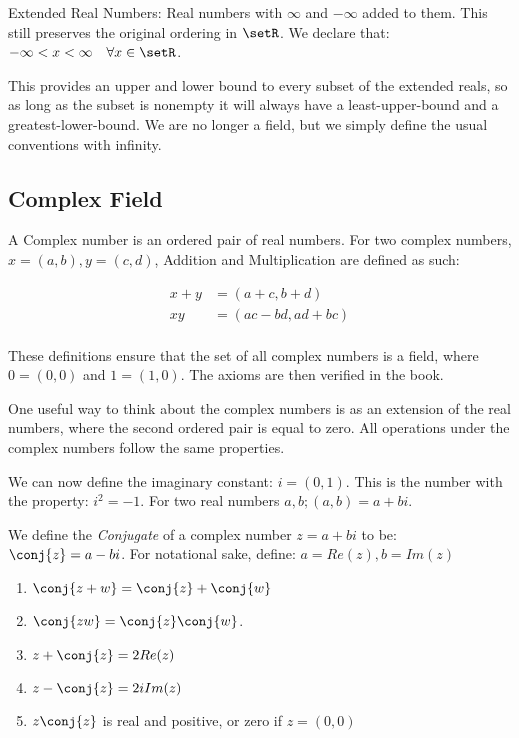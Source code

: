 \documentclass[12pt, letterpaper]{paper}
\begin{document}
Extended Real Numbers: Real numbers with $\infty$ and $-\infty$ added
to them. This still preserves the original ordering in $\setR$. We
declare that: $-\infty < x < \infty \quad \forall x \in \setR$.

This provides an upper and lower bound to every subset of the extended
reals, so as long as the subset is nonempty it will always have a
least-upper-bound and a greatest-lower-bound. We are no longer a
field, but we simply define the usual conventions with infinity.

\subsection{Complex Field}
\label{sec:org27d8085}
A Complex number is an ordered pair of real numbers. For two complex
numbers, $x = (a,b), y = (c,d)$, Addition and Multiplication are
defined as such:

\begin{align*}
  x+y &= (a+c,b+d)\\
  xy &= (ac-bd, ad+bc )\\
\end{align*}

These definitions ensure that the set of all complex numbers is a
field, where $0 = (0,0)$ and $1 = (1,0)$. The axioms are then verified
in the book.

One useful way to think about the complex numbers is as an extension
of the real numbers, where the second ordered pair is equal to
zero. All operations under the complex numbers follow the same
properties.

We can now define the imaginary constant: $i = (0,1)$. This is the
number with the property: $i^{2} = -1$. For two real numbers
$a,b; (a,b)= a + b i$.

We define the \emph{Conjugate} of a complex number $z = a+b i$ to be:
$\conj{z} = a - b i$. For notational sake, define:
$a = Re(z), b = Im(z)$

\begin{theorem}
  \label{thr:1.31}
  \begin{enumerate}
  \item $\conj{z+w} = \conj{z} + \conj{w}$
  \item $\conj{zw} = \conj{z} \conj{w}$.
  \item $z + \conj{z} = 2 Re(z)$
  \item $z - \conj{z} = 2i Im(z)$
  \item $z \conj{z}$ is real and positive, or zero if $z = (0,0)$
  \end{enumerate}
\end{theorem}
\end{document}
